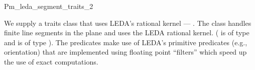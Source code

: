 
\ccRefPageBegin


\renewcommand{\ccRefPageBegin}{\begin{ccAdvanced}}
\renewcommand{\ccRefPageEnd}{\end{ccAdvanced}}

\begin{ccRefClass}{Pm_leda_segment_traits_2}

We supply a traits class that uses LEDA's rational kernel ---
.
The class handles
finite line segments in the plane
and uses the LEDA rational kernel. ( is of type 
 and  is of type
). The predicates make use of LEDA's primitive
predicates (e.g., orientation) that are implemented using floating point
``filters'' \cite{fv-sayee-96} which speed up the use of exact computations.


\ccIsModel

\end{ccRefClass}

\renewcommand{\ccRefPageBegin}{}
\renewcommand{\ccRefPageEnd}{}

\ccRefPageEnd
